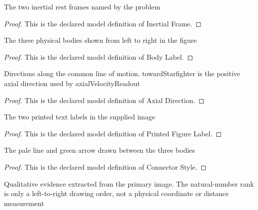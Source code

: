 \begin{definition}
  \label{def:physics:phyx-mini-0512:phyxminiproblems-problemphyxmini0512-inertialframe}
  The two inertial rest frames named by the problem
\end{definition}
\begin{proof}
  This is the declared model definition of Inertial Frame.
\end{proof}
\begin{definition}
  \label{def:physics:phyx-mini-0512:phyxminiproblems-problemphyxmini0512-bodylabel}
  The three physical bodies shown from left to right in the figure
\end{definition}
\begin{proof}
  This is the declared model definition of Body Label.
\end{proof}
\begin{definition}
  \label{def:physics:phyx-mini-0512:phyxminiproblems-problemphyxmini0512-axialdirection}
  Directions along the common line of motion. towardStarfighter is the positive axial direction used by axialVelocityReadout
\end{definition}
\begin{proof}
  This is the declared model definition of Axial Direction.
\end{proof}
\begin{definition}
  \label{def:physics:phyx-mini-0512:phyxminiproblems-problemphyxmini0512-printedfigurelabel}
  The two printed text labels in the supplied image
\end{definition}
\begin{proof}
  This is the declared model definition of Printed Figure Label.
\end{proof}
\begin{definition}
  \label{def:physics:phyx-mini-0512:phyxminiproblems-problemphyxmini0512-connectorstyle}
  The pale line and green arrow drawn between the three bodies
\end{definition}
\begin{proof}
  This is the declared model definition of Connector Style.
\end{proof}
\begin{definition}
  \label{def:physics:phyx-mini-0512:phyxminiproblems-problemphyxmini0512-spaceshipmissilefigure}
  Qualitative evidence extracted from the primary image. The natural-number rank is only a left-to-right drawing order, not a physical coordinate or distance measurement
\end{definition}
